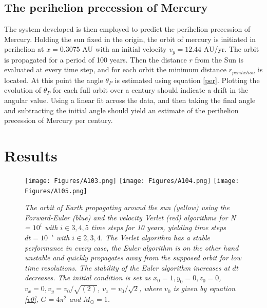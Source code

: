 \documentclass[%
reprint,nofootinbib,
amsmath,amssymb,
aps,
]{revtex4-1}
\begin{document}
\subsection*{The perihelion precession of Mercury} \noindent 
The system developed is then employed to predict the perihelion precession of Mercury. Holding the sun fixed in the origin, the orbit of mercury is initiated in perihelion at $x = 0.3075$ AU with an initial velocity $v_y = 12.44$ AU/yr. The orbit is propagated for a period of 100 years. Then the distance $r$ from the Sun is evaluated at every time step, and for each orbit the minimum distance $r_{perihelion}$ is located. At this point the angle $\theta_P$ is estimated using equation \ref{per}. Plotting the evolution of $\theta_P$ for each full orbit over a century should indicate a drift in the angular value. Using a linear fit across the data, and then taking the final angle and subtracting the initial angle should yield an estimate of the perihelion precession of Mercury per century. \\ 

\onecolumngrid

\vspace{15mm}

\section{Results} 
\vspace{5mm}

\begin{figure}[H]
	\texttt{[image: Figures/A103.png]} \hspace{5mm}
	\texttt{[image: Figures/A104.png]} \hspace{5mm}
	\texttt{[image: Figures/A105.png]}
	\caption{\textit{The orbit of Earth propagating around the sun (yellow) using the Forward-Euler (blue) and the velocity Verlet (red) algorithms for N = $10^i$ with $i\in{3,4,5}$ time steps for 10 years,  yielding time steps $dt = 10^{-i}$ with $i\in{2,3,4}$. The Verlet algorithm has a stable performance in every case, the Euler algorithm is on the other hand unstable and quickly propagates away from the supposed orbit for low time resolutions. The stability of the Euler algorithm increases at $dt$ decreases. The initial condition is set as $x_0 = 1, y_0 = 0, z_0 = 0$, $ v_x = 0, v_y = v_0/\sqrt{(2)}$, $ v_z = v_0/\sqrt{2}$, where $v_0$ is given by equation \ref{v0}, $G = 4\pi^2$ and $M_\odot = 1$.} \label{earthsun}}
\end{figure}
\end{document}
